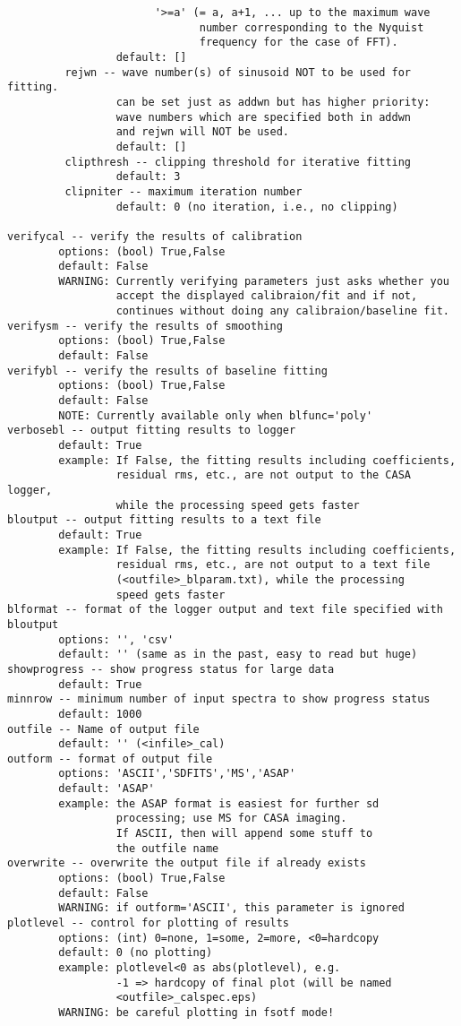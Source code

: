 \begin{verbatim}
                       '>=a' (= a, a+1, ... up to the maximum wave
                              number corresponding to the Nyquist
                              frequency for the case of FFT).
                 default: []
         rejwn -- wave number(s) of sinusoid NOT to be used for fitting.
                 can be set just as addwn but has higher priority:
                 wave numbers which are specified both in addwn
                 and rejwn will NOT be used.
                 default: []
         clipthresh -- clipping threshold for iterative fitting
                 default: 3
         clipniter -- maximum iteration number
                 default: 0 (no iteration, i.e., no clipping)

verifycal -- verify the results of calibration
        options: (bool) True,False
        default: False
        WARNING: Currently verifying parameters just asks whether you 
                 accept the displayed calibraion/fit and if not, 
                 continues without doing any calibraion/baseline fit.
verifysm -- verify the results of smoothing
        options: (bool) True,False
        default: False
verifybl -- verify the results of baseline fitting
        options: (bool) True,False
        default: False
        NOTE: Currently available only when blfunc='poly'
verbosebl -- output fitting results to logger
        default: True
        example: If False, the fitting results including coefficients, 
                 residual rms, etc., are not output to the CASA logger, 
                 while the processing speed gets faster
bloutput -- output fitting results to a text file
        default: True
        example: If False, the fitting results including coefficients, 
                 residual rms, etc., are not output to a text file 
                 (<outfile>_blparam.txt), while the processing 
                 speed gets faster
blformat -- format of the logger output and text file specified with bloutput
        options: '', 'csv'
        default: '' (same as in the past, easy to read but huge)
showprogress -- show progress status for large data
        default: True
minnrow -- minimum number of input spectra to show progress status
        default: 1000
outfile -- Name of output file
        default: '' (<infile>_cal)
outform -- format of output file
        options: 'ASCII','SDFITS','MS','ASAP'
        default: 'ASAP'
        example: the ASAP format is easiest for further sd
                 processing; use MS for CASA imaging.
                 If ASCII, then will append some stuff to
                 the outfile name
overwrite -- overwrite the output file if already exists
        options: (bool) True,False
        default: False
        WARNING: if outform='ASCII', this parameter is ignored
plotlevel -- control for plotting of results
        options: (int) 0=none, 1=some, 2=more, <0=hardcopy
        default: 0 (no plotting)
        example: plotlevel<0 as abs(plotlevel), e.g.
                 -1 => hardcopy of final plot (will be named
                 <outfile>_calspec.eps)
        WARNING: be careful plotting in fsotf mode!
\end{verbatim}
    

